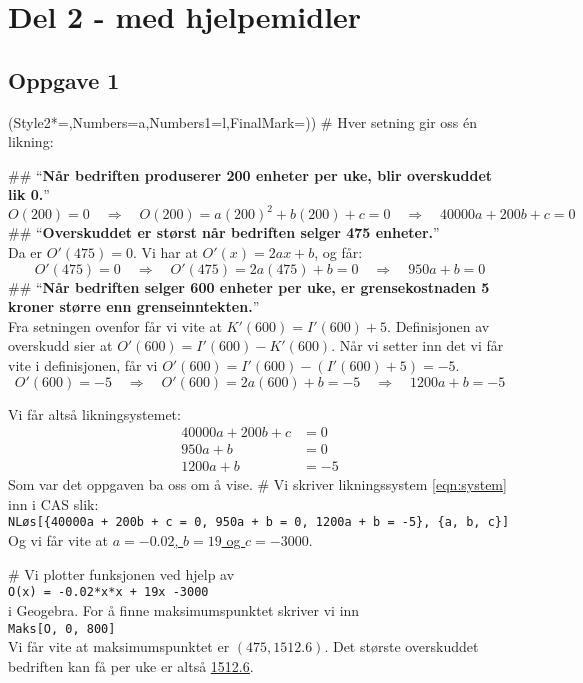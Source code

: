 \documentclass[12pt, a4paper]
{article}						%
\def\answer#1{\underline{\underline{#1}}}
\begin{document}
	
\pagebreak
\section*{Del 2 - med hjelpemidler}

\subsection*{Oppgave 1}
\begin{easylist}[enumerate]
	\ListProperties(Style2*=,Numbers=a,Numbers1=l,FinalMark={)})
	# Hver setning gir oss én likning:
	\begin{easylist}[itemize]
		## ``\textbf{Når bedriften produserer 200 enheter per uke, blir overskuddet lik 0.}'' \\
		\begin{equation*}
			O(200) = 0 \quad \Rightarrow \quad O(200) = a (200)^2 + b(200) + c = 0 \quad \Rightarrow \quad 40000a + 200b + c = 0
		\end{equation*}
		## ``\textbf{Overskuddet er størst når bedriften selger 475 enheter.}''\\
		Da er $O'(475) = 0$. Vi har at $O'(x) = 2ax + b$, og får:
		\begin{equation*}
		O'(475) = 0 \quad \Rightarrow \quad O'(475) = 2a (475) + b = 0 \quad \Rightarrow \quad 950a + b = 0
		\end{equation*}
		## ``\textbf{Når bedriften selger 600 enheter per uke, er grensekostnaden 5 kroner større enn grenseinntekten.}'' \\
		Fra setningen ovenfor får vi vite at $K'(600) = I'(600) + 5$. Definisjonen av overskudd sier at $O'(600) = I'(600) - K'(600)$. Når vi setter inn det vi får vite i definisjonen, får vi
		$O'(600) = I'(600) - \left(I'(600) + 5\right) = -5$.
		\begin{equation*}
		O'(600) = -5 \quad \Rightarrow \quad O'(600) = 2a (600) + b = -5 \quad \Rightarrow \quad 1200a + b = -5
		\end{equation*}
	\end{easylist}
	Vi får altså likningsystemet:
	\begin{align}
		\nonumber 40000a + 200b + c &= 0 \\
		\label{eqn:system}950 a + b &= 0 \\
	\nonumber	1200a + b &= -5
	\end{align}
	Som var det oppgaven ba oss om å vise.
	# Vi skriver likningssystem \eqref{eqn:system} inn i CAS slik: \\
	\verb|NLøs[{40000a + 200b + c = 0, 950a + b = 0, 1200a + b = -5}, {a, b, c}]|
	Og vi får vite at \answer{$a = -0.02$, $b = 19$ og $c = -3000$}.
	
	# Vi plotter funksjonen ved hjelp av \\
	\verb|O(x) = -0.02*x*x + 19x -3000| \\
	i Geogebra. For å finne maksimumspunktet skriver vi inn \\
	\verb|Maks[O, 0, 800]| \\
	Vi får vite at maksimumspunktet er $(475, 1512.6)$.
	Det største overskuddet bedriften kan få per uke er altså \answer{1512.6}.
\end{easylist}
\end{document}
